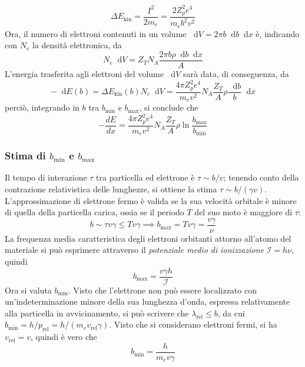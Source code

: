 \documentclass[11pt, a4paper]{scrartcl}
\theoremstyle{style}
\theoremstyle{style1}
\newcommand{\dd}{\mathop{}\!\mathrm{d}}
\numberwithin{equation}{subsection}
\begin{document}
\begin{equation}
	\Delta E_\text{kin} = \frac{I^2}{2m_e} = \frac{2 Z_p^2 e^4}{m_e b^2 v^2}
\end{equation}
Ora, il numero di elettroni contenuti in un volume $\dd V = 2\pi b \dd b \dd x$ \`e, indicando con $N_e$ la densit\`a elettronica, da
\begin{equation}
	N_e \dd V = Z_T N_A \frac{2 \pi b \rho \dd b \dd x}{A}
\end{equation}
L'energia trasferita agli elettroni del volume $\dd V$ sar\`a data, di conseguenza, da
\[
-\dd E(b) = \Delta E_\text{kin}(b) N_e \dd V = \frac{4 \pi Z_p^2 e^4}{m_e v^2} N_A \frac{Z_T}{A} \rho  \frac{\dd b}{b} \dd x
\] 
perci\`o, integrando in $b$ tra $b_\text{min}$ e $b_\text{max}$, si conclude che
\begin{equation}
	-\frac{d E}{d x}  = \frac{4\pi Z_p^2 e^4}{m_e v^2}N_A \frac{Z_T}{A}\rho  \ln \frac{b_\text{max}}{b_\text{min}}
\end{equation}

\subsubsection{Stima di $b_\text{min}$ e $b_{\text{max}}$}

Il tempo di interazione $\tau $ tra particella ed elettrone \`e $\tau \sim b / v$; tenendo conto della contrazione relativistica delle lunghezze, si ottiene la stima $\tau \sim b / (\gamma v)$.
L'approssimazione di elettrone fermo \`e valida se la sua velocit\`a orbitale \`e minore di quella della particella carica, ossia se il periodo $T$ del suo moto \`e maggiore di $\tau $:
\[
b \sim \tau  v \gamma \le  T v \gamma \implies b_\text{max} = T v \gamma = \frac{v\gamma}{\nu }
\] 
La frequenza media caratteristica degli elettroni orbitanti attorno all'atomo del materiale si pu\`o esprimere attraverso il \textit{potenziale medio di ionizzazione} $\mathcal{I} = h \nu $, quindi
\begin{equation}
	b_\text{max} = \frac{v \gamma h }{ \mathcal{I} }
\end{equation}
Ora si valuta $b_\text{min}$. 
Visto che l'elettrone non pu\`o essere localizzato con un'indeterminazione minore della sua lunghezza d'onda, espressa relativamente alla particella in avvicinamento, si pu\`o scrivere che $\lambda _\text{rel} \le  b$, da cui $b_\text{min} = h / p_\text{rel} = h / (m_ev_\text{rel}\gamma)$.
Visto che si considerano elettroni fermi, si ha $v_\text{rel} = v$, quindi \`e vero che
\begin{equation}
	b_\text{min} = \frac{h}{m_e v\gamma}
\end{equation}
\end{document}
